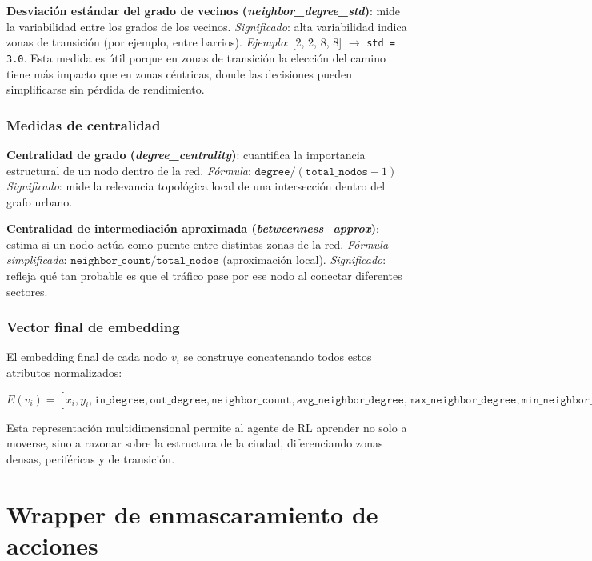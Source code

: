\documentclass[11pt,a4paper]{article}
\begin{document}
\textbf{Desviación estándar del grado de vecinos (\textit{neighbor\_degree\_std})}: mide la variabilidad entre los grados de los vecinos.  
\textit{Significado}: alta variabilidad indica zonas de transición (por ejemplo, entre barrios).  
\textit{Ejemplo}: [2, 2, 8, 8] $\rightarrow$ \texttt{std = 3.0}.  
Esta medida es útil porque en zonas de transición la elección del camino tiene más impacto que en zonas céntricas, donde las decisiones pueden simplificarse sin pérdida de rendimiento.

\subsubsection{Medidas de centralidad}

\textbf{Centralidad de grado (\textit{degree\_centrality})}: cuantifica la importancia estructural de un nodo dentro de la red.  
\textit{Fórmula}: $\texttt{degree} / (\texttt{total\_nodos} - 1)$  
\textit{Significado}: mide la relevancia topológica local de una intersección dentro del grafo urbano.

\textbf{Centralidad de intermediación aproximada (\textit{betweenness\_approx})}: estima si un nodo actúa como puente entre distintas zonas de la red.  
\textit{Fórmula simplificada}: $\texttt{neighbor\_count} / \texttt{total\_nodos}$ (aproximación local).  
\textit{Significado}: refleja qué tan probable es que el tráfico pase por ese nodo al conectar diferentes sectores.

\subsubsection{Vector final de embedding}

El embedding final de cada nodo $v_i$ se construye concatenando todos estos atributos normalizados:

\[
E(v_i) = [x_i, y_i, \texttt{in\_degree}, \texttt{out\_degree}, \texttt{neighbor\_count}, \texttt{avg\_neighbor\_degree}, \texttt{max\_neighbor\_degree}, \texttt{min\_neighbor\_degree}, \texttt{neighbor\_degree\_std}, \texttt{degree\_centrality}, \texttt{betweenness\_approx}]
\]

Esta representación multidimensional permite al agente de RL aprender no solo a moverse, sino a razonar sobre la estructura de la ciudad, diferenciando zonas densas, periféricas y de transición.

\section{Wrapper de enmascaramiento de acciones}
\end{document}
